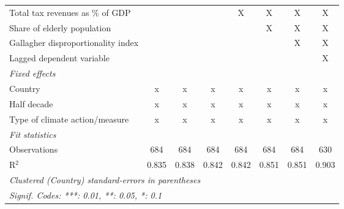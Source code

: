 \begin{table}[htbp]
\begin{tabular}{lccccccc}
      Total tax revenues as \% of GDP                                       &                &                &                & X              & X              & X              & X\\  
      Share of elderly population                                           &                &                &                &                & X              & X              & X\\  
      Gallagher disproportionality index                                    &                &                &                &                &                & X              & X\\  
      Lagged dependent variable                                             &                &                &                &                &                &                & X\\  
      \emph{Fixed effects}\\
      Country                                                               & x              & x              & x              & x              & x              & x              & x\\  
      Half decade                                                           & x              & x              & x              & x              & x              & x              & x\\  
      Type of climate action/measure                                        & x              & x              & x              & x              & x              & x              & x\\  
      \midrule \emph{Fit statistics}\\
      Observations                                                          & 684            & 684            & 684            & 684            & 684            & 684            & 630\\  
      R$^2$                                                                 & 0.835          & 0.838          & 0.842          & 0.842          & 0.851          & 0.851          & 0.903\\  
      \midrule
      \multicolumn{8}{l}{\emph{Clustered (Country) standard-errors in parentheses}}\\
      \multicolumn{8}{l}{\emph{Signif. Codes: ***: 0.01, **: 0.05, *: 0.1}}\\
   \end{tabular}
\end{table}


